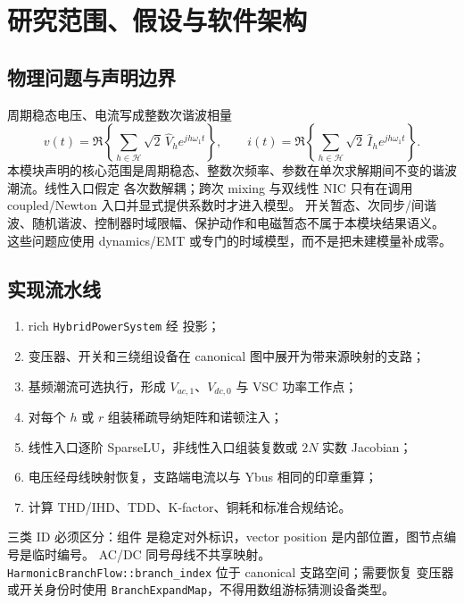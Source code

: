 \section{研究范围、假设与软件架构}
\subsection{物理问题与声明边界}
周期稳态电压、电流写成整数次谐波相量
\begin{equation}
v(t)=\Re\left\{\sum_{h\in\mathcal H} \sqrt{2}\,\hat V_h e^{jh\omega_1t}\right\},\qquad
i(t)=\Re\left\{\sum_{h\in\mathcal H} \sqrt{2}\,\hat I_h e^{jh\omega_1t}\right\}.
\end{equation}
本模块声明的核心范围是周期稳态、整数次频率、参数在单次求解期间不变的谐波潮流。线性入口假定
各次数解耦；跨次 mixing 与双线性 NIC 只有在调用 coupled/Newton 入口并显式提供系数时才进入模型。
开关暂态、次同步/间谐波、随机谐波、控制器时域限幅、保护动作和电磁暂态不属于本模块结果语义。
这些问题应使用 dynamics/EMT 或专门的时域模型，而不是把未建模量补成零。

\subsection{实现流水线}
\begin{enumerate}
  \item rich \texttt{HybridPowerSystem} 经  投影；
  \item 变压器、开关和三绕组设备在 canonical 图中展开为带来源映射的支路；
  \item 基频潮流可选执行，形成 $V_{ac,1}$、$V_{dc,0}$ 与 VSC 功率工作点；
  \item 对每个 $h$ 或 $r$ 组装稀疏导纳矩阵和诺顿注入；
  \item 线性入口逐阶 SparseLU，非线性入口组装复数或 $2N$ 实数 Jacobian；
  \item 电压经母线映射恢复，支路端电流以与 Ybus 相同的印章重算；
  \item 计算 THD/IHD、TDD、K-factor、铜耗和标准合规结论。
\end{enumerate}

三类 ID 必须区分：组件  是稳定对外标识，vector position 是内部位置，图节点编号是临时编号。
AC/DC 同号母线不共享映射。\texttt{HarmonicBranchFlow::branch\_index} 位于 canonical 支路空间；需要恢复
变压器或开关身份时使用 \texttt{BranchExpandMap}，不得用数组游标猜测设备类型。

